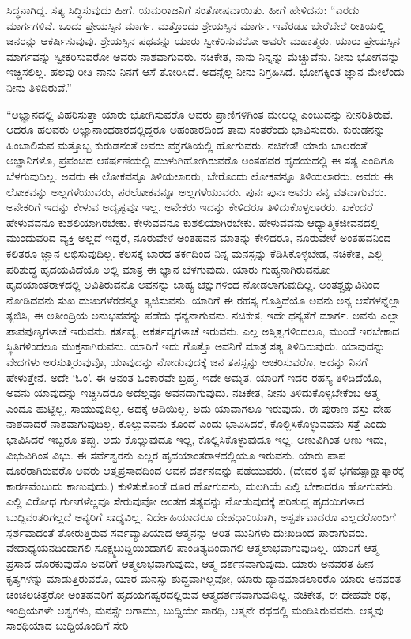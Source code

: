 ಸಿದ್ಧನಾಗಿದ್ದ. ಸತ್ಯ ಸಿದ್ಧಿಸುವುದು ಹೀಗೆ. ಯಮರಾಜನಿಗೆ ಸಂತೋಷವಾಯಿತು. ಹೀಗೆ ಹೇಳಿದನು: “ಎರಡು ಮಾರ್ಗಗಳಿವೆ. ಒಂದು ಪ್ರೇಯಸ್ಸಿನ ಮಾರ್ಗ, ಮತ್ತೊಂದು ಶ್ರೇಯಸ್ಸಿನ ಮಾರ್ಗ. ಇವೆರಡೂ ಬೇರೆಬೇರೆ ರೀತಿಯಲ್ಲಿ ಜನರನ್ನು ಆಕರ್ಷಿಸುವುವು. ಶ್ರೇಯಸ್ಸಿನ ಪಥವನ್ನು ಯಾರು ಸ್ವೀಕರಿಸುವರೋ ಅವರೇ ಮಹಾತ್ಮರು. ಯಾರು ಪ್ರೇಯಸ್ಸಿನ ಮಾರ್ಗವನ್ನು ಸ್ವೀಕರಿಸುವರೋ ಅವರು ನಾಶವಾಗುವರು. ನಚಿಕೇತ, ನಾನು ನಿನ್ನನ್ನು ಮೆಚ್ಚುವೆನು. ನೀನು ಭೋಗವನ್ನು ಇಚ್ಚಿಸಲಿಲ್ಲ. ಹಲವು ರೀತಿ ನಾನು ನಿನಗೆ ಆಸೆ ತೋರಿಸಿದೆ. ಅದನ್ನೆಲ್ಲ ನೀನು ನಿಗ್ರಹಿಸಿದೆ. ಭೋಗಕ್ಕಿಂತ ಜ್ಞಾನ ಮೇಲೆಂದು ನೀನು ತಿಳಿದಿರುವೆ.”

“ಅಜ್ಞಾನದಲ್ಲಿ ವಿಹರಿಸುತ್ತಾ ಯಾರು ಭೋಗಿಸುವರೊ ಅವರು ಪ್ರಾಣಿಗಳಿಗಿಂತ ಮೇಲಲ್ಲ ಎಂಬುದನ್ನು ನೀನರಿತಿರುವೆ. ಆದರೂ ಹಲವರು ಅಜ್ಞಾನಾಂಧಕಾರದಲ್ಲಿದ್ದರೂ ಅಹಂಕಾರದಿಂದ ತಾವು ಸಂತರೆಂದು ಭಾವಿಸುವರು. ಕುರುಡನನ್ನು ಹಿಂಬಾಲಿಸುವ ಮತ್ತೊಬ್ಬ ಕುರುಡನಂತೆ ಅವರು ವಕ್ರಗತಿಯಲ್ಲಿ ಹೋಗುವರು. ನಚಿಕೇತ! ಯಾರು ಬಾಲರಂತೆ ಅಜ್ಞಾನಿಗಳೊ, ಪ್ರಪಂಚದ ಆಕರ್ಷಣೆಯಲ್ಲಿ ಮುಳುಗಿಹೋಗಿರುವರೊ ಅಂತಹವರ ಹೃದಯದಲ್ಲಿ ಈ ಸತ್ಯ ಎಂದಿಗೂ ಬೆಳಗುವುದಿಲ್ಲ. ಅವರು ಈ ಲೋಕವನ್ನೂ ತಿಳಿಯಲಾರರು, ಬೇರೊಂದು ಲೋಕವನ್ನೂ ತಿಳಿಯಲಾರರು. ಅವರು ಈ ಲೋಕವನ್ನು ಅಲ್ಲಗಳೆಯುವರು, ಪರಲೋಕವನ್ನೂ ಅಲ್ಲಗಳೆಯುವರು. ಪುನಃ ಪುನಃ ಅವರು ನನ್ನ ವಶವಾಗುವರು. ಅನೇಕರಿಗೆ ಇದನ್ನು ಕೇಳುವ ಅದೃಷ್ಟವೂ ಇಲ್ಲ. ಅನೇಕರು ಇದನ್ನು ಕೇಳಿದರೂ ತಿಳಿದುಕೊಳ್ಳಲಾರರು. ಏಕೆಂದರೆ ಹೇಳುವವನೂ ಕುಶಲಿಯಾಗಿರಬೇಕು. ಕೇಳುವವನೂ ಕುಶಲಿಯಾಗಿರಬೇಕು. ಹೇಳುವವನು ಆಧ್ಯಾತ್ಮಿಕ\break ಜೀವನದಲ್ಲಿ ಮುಂದುವರಿದ ವ್ಯಕ್ತಿ ಅಲ್ಲದೆ ಇದ್ದರೆ, ನೂರುವೇಳೆ ಅಂತಹವನ ಮಾತನ್ನು ಕೇಳಿದರೂ, ನೂರುವೇಳೆ ಅಂತಹವನಿಂದ ಕಲಿತರೂ ಜ್ಞಾನ ಲಭಿಸುವುದಿಲ್ಲ. ಕೆಲಸಕ್ಕೆ ಬಾರದ ತರ್ಕದಿಂದ ನಿನ್ನ ಮನಸ್ಸನ್ನು ಕೆಡಿಸಿಕೊಳ್ಳಬೇಡ, ನಚಿಕೇತ, ಎಲ್ಲಿ ಪರಿಶುದ್ಧ ಹೃದಯವಿದೆಯೊ ಅಲ್ಲಿ ಮಾತ್ರ ಈ ಜ್ಞಾನ ಬೆಳಗುವುದು. ಯಾರು ಗುಹ್ಯನಾಗಿರುವನೋ ಹೃದಯಾಂತರಾಳದಲ್ಲಿ ಅವಿತಿರುವನೊ ಅವನನ್ನು ಬಾಹ್ಯ ಚಕ್ಷುಗಳಿಂದ ನೋಡಲಾಗುವುದಿಲ್ಲ. ಅಂತಶ್ಚಕ್ಷುವಿನಿಂದ ನೋಡಿದವನು ಸುಖ ದುಃಖಗಳೆರಡನ್ನೂ ತ್ಯಜಿಸುವನು. ಯಾರಿಗೆ ಈ ರಹಸ್ಯ ಗೊತ್ತಿದೆಯೊ ಅವನು ಅನ್ಯ ಆಸೆಗಳನ್ನೆಲ್ಲಾ ತ್ಯಜಿಸಿ, ಈ ಅತೀಂದ್ರಿಯ ಅನುಭವವನ್ನು ಪಡೆದು ಧನ್ಯನಾಗುವನು. ನಚಿಕೇತ, ಇದೇ ಧನ್ಯತೆಗೆ ಮಾರ್ಗ. ಅವನು ಎಲ್ಲಾ ಪಾಪಪುಣ್ಯಗಳಾಚೆ ಇರುವನು. ಕರ್ತವ್ಯ, ಅಕರ್ತವ್ಯಗಳಾಚೆ ಇರುವನು. ಎಲ್ಲ ಅಸ್ತಿತ್ವಗಳಿಂದಲೂ, ಮುಂದೆ ಇರಬೇಕಾದ ಸ್ಥಿತಿಗಳಿಂದಲೂ ಮುಕ್ತನಾಗಿರುವನು. ಯಾರಿಗೆ ಇದು ಗೊತ್ತೊ ಅವನಿಗೆ ಮಾತ್ರ ಸತ್ಯ ತಿಳಿದಿರುವುದು. ಯಾವುದನ್ನು ವೇದಗಳು ಅರಸುತ್ತಿರುವುವೊ, ಯಾವುದನ್ನು ನೋಡುವುದಕ್ಕೆ ಜನ ತಪಸ್ಸನ್ನು ಆಚರಿಸುವರೊ, ಅದನ್ನು ನಿನಗೆ ಹೇಳುತ್ತೇನೆ. ಅದೇ `ಓಂ'. ಈ ಅನಂತ ಓಂಕಾರವೇ ಬ್ರಹ್ಮ, ಇದೇ ಅಮೃತ. ಯಾರಿಗೆ ಇದರ ರಹಸ್ಯ ತಿಳಿದಿದೆಯೊ, ಅವನು ಯಾವುದನ್ನು ಇಚ್ಚಿಸಿದರೂ ಅದೆಲ್ಲವೂ ಅವನದಾಗುವುದು. ನಚಿಕೇತ, ನೀನು ತಿಳಿದುಕೊಳ್ಳಬೇಕೆಂಬ ಆತ್ಮ ಎಂದೂ ಹುಟ್ಟಿಲ್ಲ, ಸಾಯುವುದಿಲ್ಲ. ಅದಕ್ಕೆ ಆದಿಯಿಲ್ಲ. ಅದು ಯಾವಾಗಲೂ ಇರುವುದು. ಈ ಪುರಾಣ ವಸ್ತು ದೇಹ ನಾಶವಾದರೆ ನಾಶವಾಗುವುದಿಲ್ಲ. ಕೊಲ್ಲುವವನು ಕೊಂದೆ ಎಂದು ಭಾವಿಸಿದರೆ, ಕೊಲ್ಲಿಸಿಕೊಳ್ಳುವವನು ಸತ್ತೆ ಎಂದು ಭಾವಿಸಿದರೆ ಇಬ್ಬರೂ ತಪ್ಪು. ಅದು ಕೊಲ್ಲುವುದೂ ಇಲ್ಲ, ಕೊಲ್ಲಿಸಿಕೊಳ್ಳುವುದೂ ಇಲ್ಲ. ಅಣುವಿಗಿಂತ ಅಣು ಇದು, ವಿಭುವಿಗಿಂತ ವಿಭು. ಈ ಸರ್ವೆಶ್ವರನು ಎಲ್ಲರ ಹೃದಯಾಂತರಾಳದಲ್ಲಿಯೂ ಇರುವನು. ಯಾರು ಪಾಪ ದೂರರಾಗಿರುವರೊ ಅವರು ಆತ್ಮಪ್ರಸಾದದಿಂದ ಅವನ ದರ್ಶನವನ್ನು ಪಡೆಯುವರು. (ದೇವರ ಕೃಪೆ ಭಗವತ್ಸಾಕ್ಷಾತ್ಕಾರಕ್ಕೆ ಕಾರಣವೆಂಬುದು ಕಾಣುವುದು.) ಕುಳಿತುಕೊಂಡೆ ದೂರ ಹೋಗುವನು, ಮಲಗಿಯೆ ಎಲ್ಲಿ ಬೇಕಾದರೂ ಹೋಗುವನು. ಎಲ್ಲಿ ವಿರೋಧ ಗುಣಗಳೆಲ್ಲವೂ ಸೇರುವುವೋ ಅಂತಹ ಸತ್ಯವನ್ನು ನೋಡುವುದಕ್ಕೆ ಪರಿಶುದ್ಧ ಹೃದಯಿಗಳಾದ ಬುದ್ದಿವಂತರಿಗಲ್ಲದೆ ಅನ್ಯರಿಗೆ ಸಾಧ್ಯವಿಲ್ಲ. ನಿರ್ದೇಹಿಯಾದರೂ ದೇಹಧಾರಿಯಾಗಿ, ಅಸ್ಪರ್ಶವಾದರೂ ಎಲ್ಲದರೊಂದಿಗೆ ಸ್ಪರ್ಶವಾದಂತೆ ತೋರುತ್ತಿರುವ ಸರ್ವವ್ಯಾಪಿಯಾದ ಆತ್ಮನನ್ನು ಅರಿತ ಮುನಿಗಳು ದುಃಖದಿಂದ ಪಾರಾಗುವರು. ವೇದಾಧ್ಯಯನದಿಂದಾಗಲಿ ಸೂಕ್ಷ್ಮಬುದ್ದಿಯಿಂದಾಗಲಿ ಪಾಂಡಿತ್ಯದಿಂದಾಗಲಿ ಆತ್ಮಲಾಭವಾಗುವುದಿಲ್ಲ. ಯಾರಿಗೆ ಆತ್ಮ ಪ್ರಸಾದ ದೊರಕುವುದೊ ಅವರಿಗೆ ಆತ್ಮಲಾಭವಾಗುವುದು, ಆತ್ಮ ದರ್ಶನವಾಗುವುದು. ಯಾರು ಅನವರತ ಹೀನ ಕೃತ್ಯಗಳನ್ನು ಮಾಡುತ್ತಿರುವರೊ, ಯಾರ ಮನಸ್ಸು ಶುದ್ಧವಾಗಿಲ್ಲವೋ, ಯಾರು ಧ್ಯಾನಮಾಡಲಾರರೊ ಯಾರು ಅನವರತ ಚಂಚಲಚಿತ್ತರೋ ಅಂತಹವರಿಗೆ ಹೃದಯಗಹ್ವರದಲ್ಲಿರುವ ಆತ್ಮದರ್ಶನವಾಗುವುದಿಲ್ಲ. ನಚಿಕೇತ, ಈ ದೇಹವೇ ರಥ, ಇಂದ್ರಿಯಗಳೇ ಅಶ್ವಗಳು, ಮನಸ್ಸೇ ಲಗಾಮು, ಬುದ್ದಿಯೇ ಸಾರಥಿ, ಆತ್ಮನೇ ರಥದಲ್ಲಿ ಮಂಡಿಸಿರುವವನು. ಆತ್ಮವು ಸಾರಥಿಯಾದ ಬುದ್ದಿಯೊಂದಿಗೆ ಸೇರಿ 